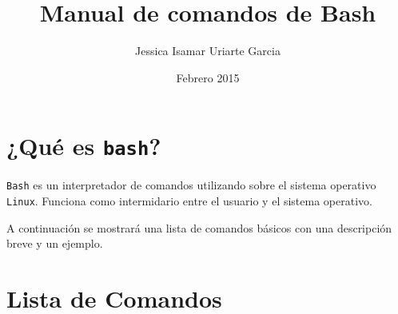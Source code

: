 \documentclass[12pt]{article}
\title{Manual de comandos de Bash}
\author {Jessica Isamar Uriarte Garcia}
\date{Febrero 2015}
\begin{document}
\maketitle
  
  
  
  \section{¿Qué es {\tt bash}?}



 {\tt Bash} es un interpretador de comandos utilizando sobre el sistema operativo {\tt Linux}.
 Funciona como intermidario entre el usuario y el sistema operativo. \par
 A continuación se mostrará una lista de comandos básicos con una descripción breve y un ejemplo. 




 \section{Lista de Comandos}


 
 
\end{document}
